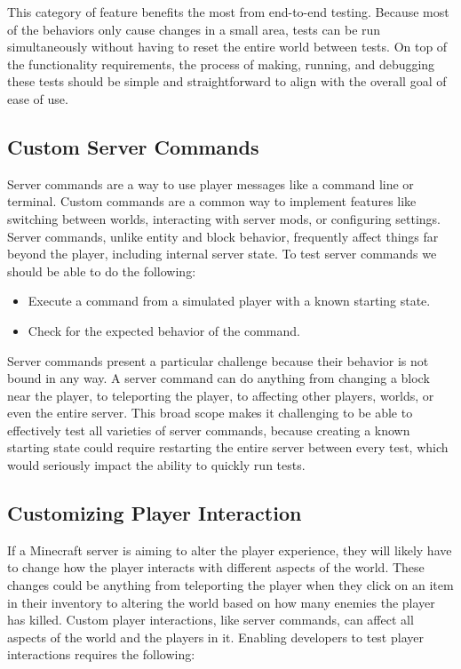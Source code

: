 \documentclass{article}
\begin{document}
\begin{onehalfspacing}
This category of feature benefits the most from end-to-end testing.
Because most of the behaviors only cause changes in a small area, tests
can be run simultaneously without having to reset the entire world
between tests. On top of the functionality requirements, the process of
making, running, and debugging these tests should be simple and
straightforward to align with the overall goal of ease of use.

\subsection{Custom Server Commands}

Server commands are a way to use player messages like a command line or
terminal. Custom commands are a common way to implement features like
switching between worlds, interacting with server mods, or configuring
settings. Server commands, unlike entity and block behavior, frequently
affect things far beyond the player, including internal server state. To
test server commands we should be able to do the following:

\begin{itemize}
\item
  Execute a command from a simulated player with a known starting state.
\item
  Check for the expected behavior of the command.
\end{itemize}

Server commands present a particular challenge because their behavior is
not bound in any way. A server command can do anything from changing a
block near the player, to teleporting the player, to affecting other
players, worlds, or even the entire server. This broad scope makes it
challenging to be able to effectively test all varieties of server
commands, because creating a known starting state could require
restarting the entire server between every test, which would seriously
impact the ability to quickly run tests.

\subsection{Customizing Player Interaction}

If a Minecraft server is aiming to alter the player experience, they
will likely have to change how the player interacts with different
aspects of the world. These changes could be anything from teleporting
the player when they click on an item in their inventory to altering the
world based on how many enemies the player has killed. Custom player
interactions, like server commands, can affect all aspects of the world
and the players in it. Enabling developers to test player interactions
requires the following:


\end{onehalfspacing}
\end{document}

